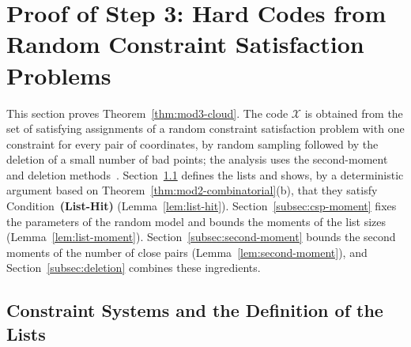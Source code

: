 \documentclass[11pt]{article}
\theoremstyle{definition}
\theoremstyle{remark}
\begin{document}
\section{Proof of Step 3: Hard Codes from Random Constraint Satisfaction Problems}
\label{sec:csp-cloud}

This section proves Theorem~\ref{thm:mod3-cloud}. The code $\mathcal{X}$ is obtained from the set of satisfying assignments of a random constraint satisfaction problem with one constraint for every pair of coordinates, by random sampling followed by the deletion of a small number of bad points; the analysis uses the second-moment and deletion methods~\cite{alon2016probabilistic}. Section~\ref{subsec:csp-lists} defines the lists and shows, by a deterministic argument based on Theorem~\ref{thm:mod2-combinatorial}(b), that they satisfy Condition~\textbf{(List-Hit)} (Lemma~\ref{lem:list-hit}). Section~\ref{subsec:csp-moment} fixes the parameters of the random model and bounds the moments of the list sizes (Lemma~\ref{lem:list-moment}). Section~\ref{subsec:second-moment} bounds the second moments of the number of close pairs (Lemma~\ref{lem:second-moment}), and Section~\ref{subsec:deletion} combines these ingredients.

\subsection{Constraint Systems and the Definition of the Lists}
\label{subsec:csp-lists}
\end{document}
